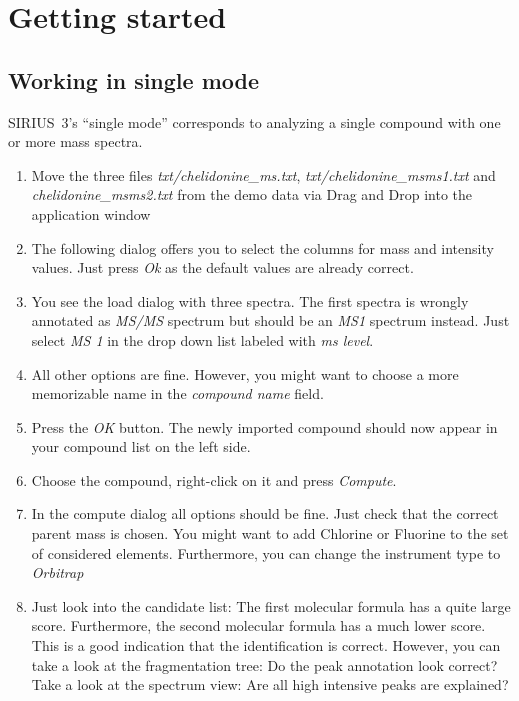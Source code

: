 \documentclass[letterpaper,10pt,openany,oneside]{sphinxmanual}
\begin{document}

\section{Getting started}

\subsection{Working in single mode}
\label{gui:working-in-single-mode}

SIRIUS~3's ``single mode'' corresponds to analyzing a single compound with
one or more mass spectra.

\begin{enumerate}
\item {} 
Move the three files \emph{txt/chelidonine\_ms.txt}, \emph{txt/chelidonine\_msms1.txt} and \emph{chelidonine\_msms2.txt} from the demo data via Drag and Drop into the application window

\item {} 
The following dialog offers you to select the columns for mass and intensity values. Just press \emph{Ok} as the default values are already correct.

\item {} 
You see the load dialog with three spectra. The first spectra is wrongly
annotated as \emph{MS/MS} spectrum but should be an \emph{MS1} spectrum
instead. Just select \emph{MS 1} in the drop down list labeled with \emph{ms
level}.

\item {} 
All other options are fine. However, you might want to choose a more memorizable name in the \emph{compound name} field.

\item {} 
Press the \emph{OK} button. The newly imported compound should now appear in your compound list on the left side.

\item {} 
Choose the compound, right-click on it and press \emph{Compute}.

\item {} 
In the compute dialog all options should be fine. Just check that the correct parent mass is chosen. You might want to add Chlorine or Fluorine to the set of considered elements. Furthermore, you can change the instrument type to \emph{Orbitrap}

\item {} 
Just look into the candidate list: The first molecular formula has a quite large score. Furthermore, the second molecular formula has a much lower score. This is a good indication that the identification is correct. However, you can take a look at the fragmentation tree: Do the peak annotation look correct? Take a look at the spectrum view: Are all high intensive peaks are explained?


\end{enumerate}
\end{document}

